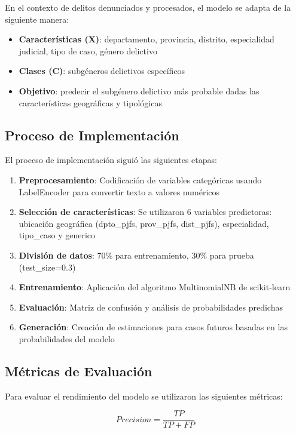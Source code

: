 \documentclass[conference]{IEEEtran}
\begin{document}
En el contexto de delitos denunciados y procesados, el modelo se adapta de la siguiente manera:

\begin{itemize}
\item \textbf{Características (X)}: departamento, provincia, distrito, especialidad judicial, tipo de caso, género delictivo
\item \textbf{Clases (C)}: subgéneros delictivos específicos
\item \textbf{Objetivo}: predecir el subgénero delictivo más probable dadas las características geográficas y tipológicas
\end{itemize}

\subsection{Proceso de Implementación}

El proceso de implementación siguió las siguientes etapas:

\begin{enumerate}
\item \textbf{Preprocesamiento}: Codificación de variables categóricas usando LabelEncoder para convertir texto a valores numéricos
\item \textbf{Selección de características}: Se utilizaron 6 variables predictoras: ubicación geográfica (dpto\_pjfs, prov\_pjfs, dist\_pjfs), especialidad, tipo\_caso y generico
\item \textbf{División de datos}: 70\% para entrenamiento, 30\% para prueba (test\_size=0.3)
\item \textbf{Entrenamiento}: Aplicación del algoritmo MultinomialNB de scikit-learn
\item \textbf{Evaluación}: Matriz de confusión y análisis de probabilidades predichas
\item \textbf{Generación}: Creación de estimaciones para casos futuros basadas en las probabilidades del modelo
\end{enumerate}

\subsection{Métricas de Evaluación}

Para evaluar el rendimiento del modelo se utilizaron las siguientes métricas:

\begin{equation}
Precision = \frac{TP}{TP + FP}
\end{equation}
\end{document}
